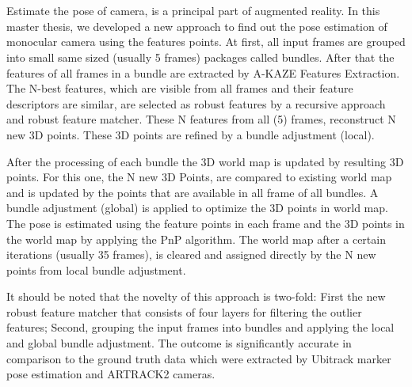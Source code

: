 \chapter{\abstractname}
Estimate the pose of camera, is a principal part of augmented reality. In this master thesis, we developed a new approach to find out the pose estimation of monocular camera using the features points. At first, all input frames are grouped into small same sized (usually 5 frames) packages called bundles. After that the features of all frames in a bundle are extracted by A-KAZE Features Extraction. The N-best features, which are visible from all frames and their feature descriptors are similar, are selected as robust features by a recursive approach and robust feature matcher. These N features from all (5) frames, reconstruct N new 3D points. These 3D points are refined by a bundle adjustment (local).

After the processing of each bundle the 3D world map is updated by resulting 3D points. For this one, the N new 3D Points, are compared to existing world map and is updated by the points that are available in all frame of all bundles. A bundle adjustment (global) is applied to optimize the 3D points in world map. The pose is estimated using the feature points in each frame and the 3D points in the world map by applying the PnP algorithm. The world map after a certain iterations (usually 35 frames), is cleared and assigned directly by the N new points from local bundle adjustment.

It should be noted that the novelty of this approach is two-fold: First the new robust feature matcher that consists of four layers for filtering the outlier features; Second, grouping the input frames into bundles and applying the local and global bundle adjustment. The outcome is significantly accurate in comparison to the ground truth data which were extracted by Ubitrack marker pose estimation and ARTRACK2 cameras.